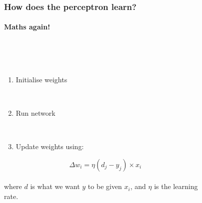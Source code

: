 \documentclass{beamer}
\begin{document}
\begin{frame}
\frametitle{How does the perceptron learn?}
\framesubtitle{Maths again!}
  \begin{columns}[T]
    \begin{column}{.5\textwidth} 
        \  \\
 \   \\ 
\begin{enumerate}
 \item Initialise weights
 
 \ \\
 \item Run network
 
 \ \\
 
 \item Update weights using:

\end{enumerate}
 
 \begin{equation*}
  \Delta w_i = \eta ( d_j - y_j ) \times x_{i}
 \end{equation*} 
  \ \\
 
 where $d$ is what we want $y$ to be given $x_i$, and $\eta$ is the learning rate.

    \end{column}
    \begin{column}{.5\textwidth}
\begin{figure}
 

\end{figure}
\end{column}
\end{columns}
\end{frame}
\end{document}
